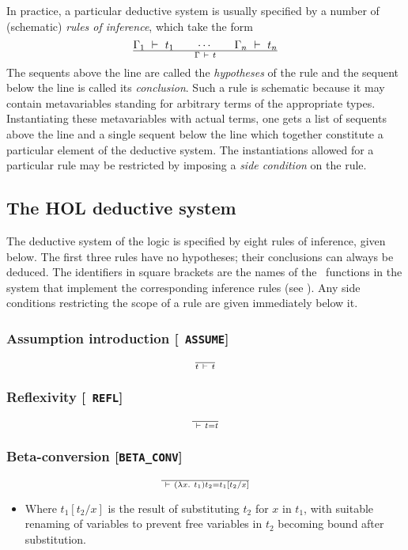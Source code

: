 In practice, a particular deductive system is usually specified by a
number of (schematic) \emph{rules of inference},
which take the form
\[
\Gamma_1\ \vdash\  t_1 \qquad\cdots\qquad\Gamma_n\ \vdash\  t_n
\over
\Gamma \ \vdash\  t
\]
The sequents above the line are called the {\it
hypotheses\/} of the rule and the
sequent below the line is called its {\it
conclusion}. Such a rule is
schematic because it may contain metavariables
standing for arbitrary terms of the appropriate types. Instantiating
these metavariables with actual terms, one gets a list of sequents
above the line and a single sequent below the line which together
constitute a particular element of the deductive system. The
instantiations allowed for a particular rule may be restricted by
imposing a {\em side condition\/} on the rule.


\subsection{The HOL deductive system}
\label{HOLrules}

The deductive system of the \HOL{} logic is specified by eight rules
of inference, given below.  The first three rules have no hypotheses;
their conclusions can always be deduced. The identifiers in square
brackets are the names of the \ML\ functions in the \HOL{} system that
implement the corresponding inference rules (see \DESCRIPTION). Any
side conditions restricting the scope of a rule are given immediately
below it.

\bigskip

\subsubsection*{Assumption introduction [{\small\tt
ASSUME}]}
\[
\over t
\ \vdash\  t
\]

\subsubsection*{Reflexivity [{\small\tt
REFL}]}
\[
\over
\ \vdash\  t = t
\]

\subsubsection*{Beta-conversion [{\small\tt BETA\_CONV}]}
\[
\over
\ \vdash\  (\lambda x.\ t_1)t_2 = t_1[t_2/x]
\]
\begin{itemize}
\item Where $t_1[t_2/x]$ is
the result of substituting $t_2$ for $x$
in $t_1$, with suitable renaming of variables to prevent free variables
in $t_2$ becoming bound after substitution.
\end{itemize}

